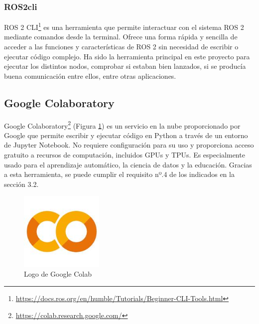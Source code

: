 \subsubsection{ROS2cli}

ROS 2 \ac{CLI}\footnote{\url{https://docs.ros.org/en/humble/Tutorials/Beginner-CLI-Tools.html}} es una herramienta que permite interactuar con el sistema ROS 2 mediante comandos desde la terminal. Ofrece una forma rápida y sencilla de acceder a las funciones y características de ROS 2 sin necesidad de escribir o ejecutar código complejo. Ha sido la herramienta principal en este proyecto para ejecutar los distintos nodos, comprobar si estaban bien lanzados, si se producía buena comunicación entre ellos, entre otras aplicaciones.


\subsection{Google Colaboratory}

Google Colaboratory\footnote{\url{https://colab.research.google.com/}} (Figura \ref{fig:googlecolab}) es un servicio en la nube proporcionado por Google que permite escribir y ejecutar código en Python a través de un entorno de Jupyter Notebook. No requiere configuración para su uso y proporciona acceso gratuito a recursos de computación, incluidos GPUs y TPUs. Es especialmente usado para el aprendizaje automático, la ciencia de datos y la educación. Gracias a esta herramienta, se puede cumplir el requisito nº.4 de los indicados en la sección 3.2.

\begin{figure} [h!]
	\begin{center}
		\includegraphics[width=4cm]{figs/googlecolab.png}
	\end{center}
	\caption{Logo de Google Colab} %
	\label{fig:googlecolab}
\end{figure}


